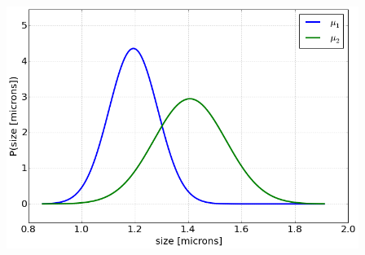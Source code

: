 \begin{center}\includegraphics[width=4.5in]{Applications_of_Parameter_Estimation/Applications_of_Parameter_Estimation_fig10.png}\end{center}

\begin{lstlisting}

\end{lstlisting}

